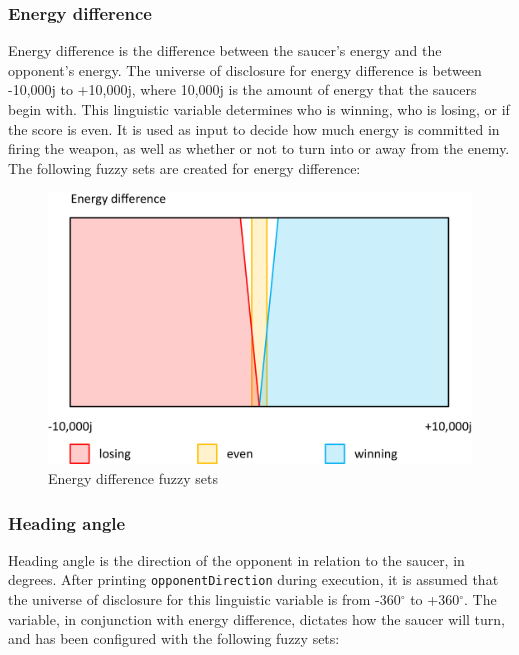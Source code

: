 \subsubsection{Energy difference}

Energy difference is the difference between the saucer's energy and the opponent's energy. The universe of disclosure for energy difference is between -10,000j to +10,000j, where 10,000j is the amount of energy that the saucers begin with. This linguistic variable determines who is winning, who is losing, or if the score is even. It is used as input to decide how much energy is committed in firing the weapon, as well as whether or not to turn into or away from the enemy. The following fuzzy sets are created for energy difference:

\begin{figure}[H]
\centering
\caption{Energy difference fuzzy sets}
\includegraphics[scale=0.1]{./img/pdf/energyDiffSets.pdf}
\end{figure}

\subsubsection{Heading angle}

Heading angle is the direction of the opponent in relation to the saucer, in degrees. After printing \texttt{opponentDirection} during execution, it is assumed that the universe of disclosure for this linguistic variable is from -360$^{\circ}$ to +360$^{\circ}$. The variable, in conjunction with energy difference, dictates how the saucer will turn, and has been configured with the following fuzzy sets:

